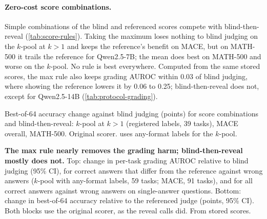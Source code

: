 \paragraph{Zero-cost score combinations.}
Simple combinations of the blind and referenced scores compete with blind-then-reveal (\cref{tab:score-rules}). Taking the maximum loses nothing to blind judging on the $k$-pool at $k{>}1$ and keeps the reference's benefit on \textsc{MACE}, but on MATH-500 it trails the reference for Qwen2.5-7B; the mean does best on MATH-500 and worse on the $k$-pool. No rule is best everywhere. Computed from the same stored scores, the max rule also keeps grading AUROC within 0.03 of blind judging, where showing the reference lowers it by 0.06 to 0.25; blind-then-reveal does not, except for Qwen2.5-14B (\cref{tab:protocol-grading}).\ph

\begin{table}[htbp]
\centering
\footnotesize
\caption{Best-of-64 accuracy change against blind judging (points) for score combinations and blind-then-reveal: $k$-pool at $k{>}1$ (registered labels, 39 tasks), \textsc{MACE} overall, MATH-500. Original scorer.  uses any-format labels for the $k$-pool.\ph}
\label{tab:score-rules}
\begin{adjustbox}{max width=\linewidth}\end{adjustbox}
\end{table}

\begin{table}[htbp]
\centering
\footnotesize
\caption{\textbf{The max rule nearly removes the grading harm; blind-then-reveal mostly does not.} Top: change in per-task grading AUROC relative to blind judging (95\% CI), for correct answers that differ from the reference against wrong answers ($k$-pool with any-format labels, 59 tasks; \textsc{MACE}, 91 tasks), and for all correct answers against wrong answers on single-answer questions. Bottom: change in best-of-64 accuracy relative to the referenced judge (points, 95\% CI). Both blocks use the original scorer, as the reveal calls did. From stored scores.\ph}
\label{tab:protocol-grading}
\begin{adjustbox}{max width=\linewidth}\end{adjustbox}\\[6pt]
\begin{adjustbox}{max width=\linewidth}\end{adjustbox}
\end{table}

